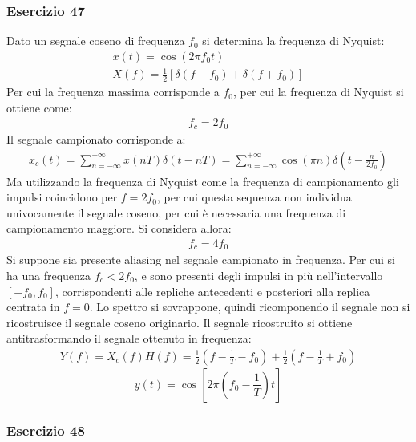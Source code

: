 \documentclass{article}
\begin{document}
\subsubsection*{Esercizio 47}

Dato un segnale coseno di frequenza $f_0$ si determina la frequenza di Nyquist:
\begin{gather*}
    x(t)=\cos(2\pi f_0t)\\
    X(f)=\displaystyle\frac{1}{2}\left[\delta(f-f_0)+\delta(f+f_0)\right]
\end{gather*}
Per cui la frequenza massima corrisponde a $f_0$, per cui la frequenza di Nyquist si ottiene come:
\begin{gather}
    f_c=2f_0
\end{gather}
Il segnale campionato corrisponde a:
\begin{gather*}
    x_c(t)=\displaystyle\sum_{n=-\infty}^{+\infty}x(nT)\delta(t-nT)=\sum_{n=-\infty}^{+\infty}\cos(\pi n)\delta\left(t-\frac{n}{2f_0}\right)
\end{gather*}
Ma utilizzando la frequenza di Nyquist come la frequenza di campionamento gli impulsi coincidono per $f=2f_0$, per cui questa sequenza non individua univocamente il segnale 
coseno, per cui è necessaria una frequenza di campionamento maggiore. Si considera allora:
\begin{gather*}
    f_c=4f_0
\end{gather*}
Si suppone sia presente aliasing nel segnale campionato in frequenza. Per cui si ha una frequenza $f_c<2f_0$, e sono presenti degli impulsi in più nell'intervallo $[-f_0,f_0]$, 
corrispondenti alle repliche antecedenti e posteriori alla replica centrata in $f=0$. Lo spettro si sovrappone, quindi ricomponendo il segnale non si ricostruisce il 
segnale coseno originario. 
Il segnale ricostruito si ottiene antitrasformando il segnale ottenuto in frequenza:
\begin{gather*}
    Y(f)=X_c(f)H(f)=\displaystyle\frac{1}{2}\left(f-\frac{1}{T}-f_0\right)+\frac{1}{2}\left(f-\frac{1}{T}+f_0\right)
\end{gather*}
\begin{equation}
    y(t)=\cos\left[2\pi \left(f_0-\frac{1}{T}\right)t\right]
\end{equation}

\subsubsection*{Esercizio 48}
\end{document}

